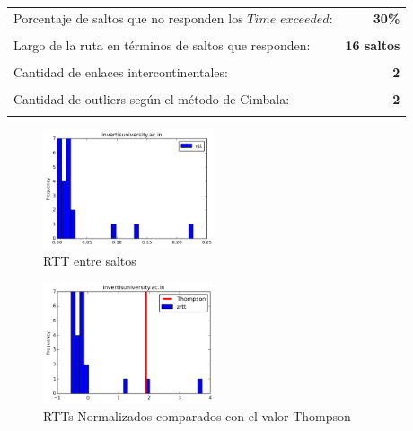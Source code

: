 \begin{center}
\begin{tabular}{p{6.5cm}r}
Porcentaje de saltos que no responden los $Time$ $exceeded$: & \textbf{30\%} \\ \\ 
Largo de la ruta en términos de saltos que responden: &\textbf{16 saltos} \\ \\
Cantidad de enlaces intercontinentales: & \textbf{2} \\ \\
Cantidad de outliers según el método de Cimbala: & \textbf{2} \\ \\
\end{tabular}
\end{center}

\begin{figure}[H]
  \centering
    \includegraphics[width=0.45\textwidth]{histogramas_rtt/invertisuniversity-ac-in.png}
  \caption{RTT entre saltos}
  \label{entropia-s}
\end{figure}

\begin{center}

\end{center}

\begin{figure}[H]
  \centering
    \includegraphics[width=0.45\textwidth]{histogramas_thompson/invertisuniversity-ac-in.png}
  \caption{RTTs Normalizados comparados con el valor Thompson}
  \label{entropia-s}
\end{figure}

